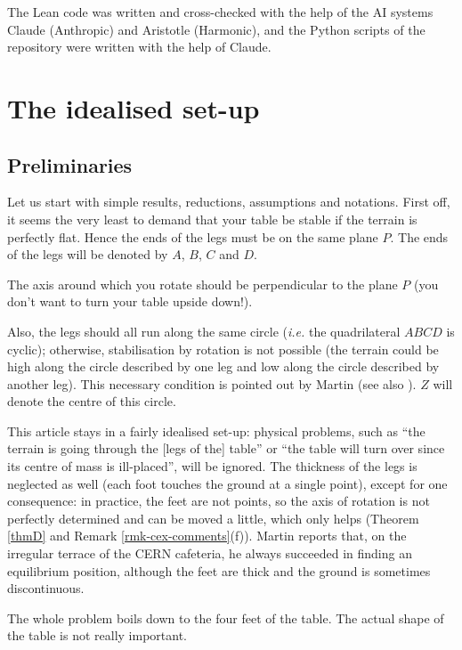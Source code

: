 \documentclass[a4paper,11pt,twoside,leqno]{article}
\numberwithin{equation}{section}
\begin{document}
The Lean code was written and cross-checked with the help of the AI systems Claude (Anthropic) and Aristotle (Harmonic), and the Python scripts of the repository were written with the help of Claude.



\section{The idealised set-up}\label{s-ideal}

\subsection{Preliminaries}

Let us start with simple results, reductions, assumptions and notations.
 First off, it seems the very least to demand that your table be stable if the terrain is perfectly flat. Hence the ends of the legs must be on the same plane $P$. The ends of the legs will be denoted by $A$, $B$, $C$ and $D$.

 The axis around which you rotate should be perpendicular to the plane $P$ (you don't want to turn your table upside down!).

 Also, the legs should all run along the same circle (\emph{i.e.} the quadrilateral $ABCD$ is cyclic); otherwise, stabilisation by rotation is not possible (the terrain could be high along the circle described by one leg and low along the circle described by another leg). This necessary condition is pointed out by Martin \cite[\S{}4]{Mar} (see also \cite[\S{}4]{BLPR}). $Z$ will denote the centre of this circle.

 This article stays in a fairly idealised set-up: physical problems, such as ``the terrain is going through the [legs of the] table'' or ``the table will turn over since its centre of mass is ill-placed'', will be ignored. The thickness of the legs is neglected as well (each foot touches the ground at a single point), except for one consequence: in practice, the feet are not points, so the axis of rotation is not perfectly determined and can be moved a little, which only helps (Theorem \ref{thmD} and Remark \ref{rmk-cex-comments}(f)). Martin \cite[\S{}1]{Mar} reports that, on the irregular terrace of the CERN cafeteria, he always succeeded in finding an equilibrium position, although the feet are thick and the ground is sometimes discontinuous.

 The whole problem boils down to the four feet of the table. The actual shape of the table is not really important.
\end{document}
